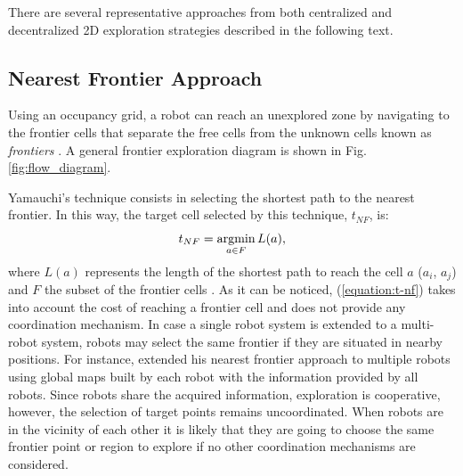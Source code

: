 There are several representative approaches from both centralized and decentralized 2D exploration strategies described in the following text. 

\subsection{Nearest Frontier Approach} 
Using an occupancy grid, a robot can reach an unexplored zone by navigating to the frontier cells that separate the free cells from the unknown cells known as \textit{frontiers} \cite{Yamauchi1997}. A general frontier exploration diagram is shown in Fig. \ref{fig:flow_diagram}.

Yamauchi's technique consists in selecting the shortest path to the nearest frontier. In this way, the target cell selected by this technique, $t_{NF}$, is:
\begin{equation}
t_{NF} = \operatorname*{argmin}_{a \in F} L(a), 
\label{equation:t-nf}
\end{equation}
where $L(a)$ represents the length of the shortest path to reach the cell $a$ ($a_{i}$, $a_{j}$) and $F$ the subset of the frontier cells \cite{Julia2012}. As it can be noticed, (\ref{equation:t-nf}) takes into account the cost of reaching a frontier cell and does not provide any coordination mechanism. In case a single robot system is extended to a multi-robot system, robots may select the same frontier if they are situated in nearby positions. For instance, \cite{Yamauchi1998} extended his nearest frontier approach to multiple robots using global maps built by each robot with the information provided by all robots. Since robots share the acquired information, exploration is cooperative, however, the selection of target points remains uncoordinated. When robots are in the vicinity of each other it is likely that they are going to choose the same frontier point or region to explore if no other coordination mechanisms are considered.

